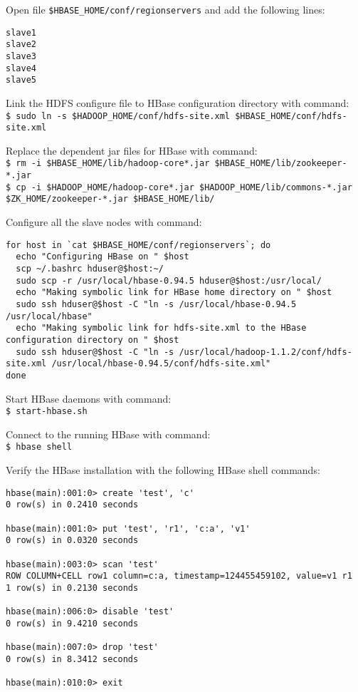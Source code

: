 Open file \verb|$HBASE_HOME/conf/regionservers| and add the following lines:
\begin{verbatim}
slave1
slave2
slave3
slave4
slave5
\end{verbatim}

Link the HDFS configure file to HBase configuration directory with command: \\
\verb|$ sudo ln -s $HADOOP_HOME/conf/hdfs-site.xml $HBASE_HOME/conf/hdfs-site.xml|

Replace the dependent jar files for HBase with command: \\
\verb|$ rm -i $HBASE_HOME/lib/hadoop-core*.jar $HBASE_HOME/lib/zookeeper-*.jar| \\
\verb|$ cp -i $HADOOP_HOME/hadoop-core*.jar $HADOOP_HOME/lib/commons-*.jar $ZK_HOME/zookeeper-*.jar $HBASE_HOME/lib/|

Configure all the slave nodes with command:
\begin{verbatim}
for host in `cat $HBASE_HOME/conf/regionservers`; do
  echo "Configuring HBase on " $host
  scp ~/.bashrc hduser@$host:~/
  sudo scp -r /usr/local/hbase-0.94.5 hduser@$host:/usr/local/
  echo "Making symbolic link for HBase home directory on " $host
  sudo ssh hduser@$host -C "ln -s /usr/local/hbase-0.94.5 /usr/local/hbase"
  echo "Making symbolic link for hdfs-site.xml to the HBase configuration directory on " $host
  sudo ssh hduser@$host -C "ln -s /usr/local/hadoop-1.1.2/conf/hdfs-site.xml /usr/local/hbase-0.94.5/conf/hdfs-site.xml"
done
\end{verbatim}

Start HBase daemons with command: \\
\verb|$ start-hbase.sh|

Connect to the running HBase with command: \\
\verb|$ hbase shell|

Verify the HBase installation with the following HBase shell commands: 
\begin{verbatim}
hbase(main):001:0> create 'test', 'c'
0 row(s) in 0.2410 seconds

hbase(main):001:0> put 'test', 'r1', 'c:a', 'v1'
0 row(s) in 0.0320 seconds

hbase(main):003:0> scan 'test'
ROW COLUMN+CELL row1 column=c:a, timestamp=124455459102, value=v1 r1
1 row(s) in 0.2130 seconds

hbase(main):006:0> disable 'test'
0 row(s) in 9.4210 seconds

hbase(main):007:0> drop 'test'
0 row(s) in 8.3412 seconds

hbase(main):010:0> exit
\end{verbatim}

